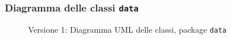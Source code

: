 \subsubsection{Diagramma delle classi \texttt{data}}
\vspace{0.5cm}
\begin{figure}[H]
    \centering
    \caption{Versione 1: Diagramma UML delle classi, package \texttt{data}}
    \label{fig:class_data_v_1}
\end{figure}